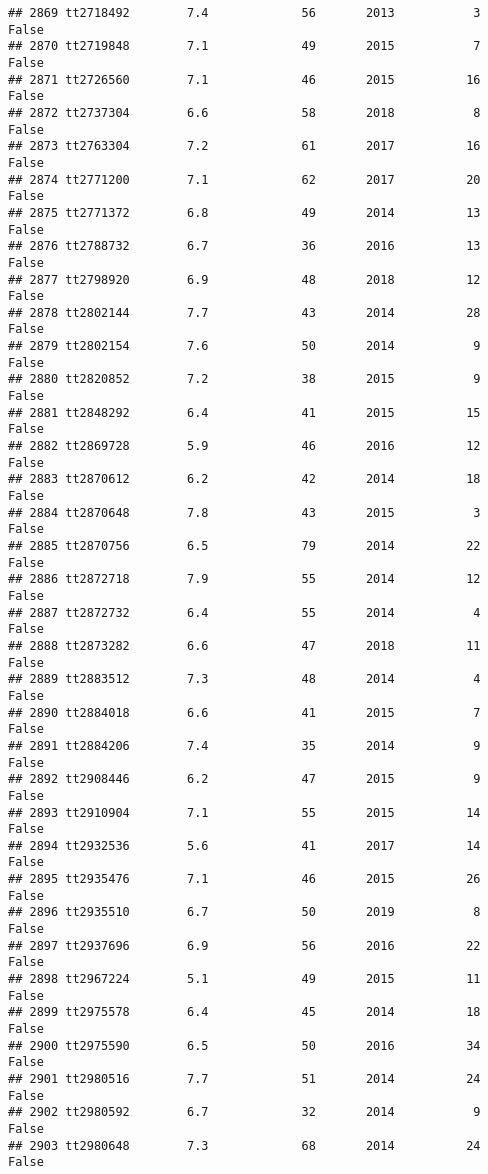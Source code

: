 \documentclass[
]{article}
\begin{document}
\begin{verbatim}
## 2869 tt2718492        7.4             56       2013           3   False
## 2870 tt2719848        7.1             49       2015           7   False
## 2871 tt2726560        7.1             46       2015          16   False
## 2872 tt2737304        6.6             58       2018           8   False
## 2873 tt2763304        7.2             61       2017          16   False
## 2874 tt2771200        7.1             62       2017          20   False
## 2875 tt2771372        6.8             49       2014          13   False
## 2876 tt2788732        6.7             36       2016          13   False
## 2877 tt2798920        6.9             48       2018          12   False
## 2878 tt2802144        7.7             43       2014          28   False
## 2879 tt2802154        7.6             50       2014           9   False
## 2880 tt2820852        7.2             38       2015           9   False
## 2881 tt2848292        6.4             41       2015          15   False
## 2882 tt2869728        5.9             46       2016          12   False
## 2883 tt2870612        6.2             42       2014          18   False
## 2884 tt2870648        7.8             43       2015           3   False
## 2885 tt2870756        6.5             79       2014          22   False
## 2886 tt2872718        7.9             55       2014          12   False
## 2887 tt2872732        6.4             55       2014           4   False
## 2888 tt2873282        6.6             47       2018          11   False
## 2889 tt2883512        7.3             48       2014           4   False
## 2890 tt2884018        6.6             41       2015           7   False
## 2891 tt2884206        7.4             35       2014           9   False
## 2892 tt2908446        6.2             47       2015           9   False
## 2893 tt2910904        7.1             55       2015          14   False
## 2894 tt2932536        5.6             41       2017          14   False
## 2895 tt2935476        7.1             46       2015          26   False
## 2896 tt2935510        6.7             50       2019           8   False
## 2897 tt2937696        6.9             56       2016          22   False
## 2898 tt2967224        5.1             49       2015          11   False
## 2899 tt2975578        6.4             45       2014          18   False
## 2900 tt2975590        6.5             50       2016          34   False
## 2901 tt2980516        7.7             51       2014          24   False
## 2902 tt2980592        6.7             32       2014           9   False
## 2903 tt2980648        7.3             68       2014          24   False

\end{verbatim}
\end{document}
